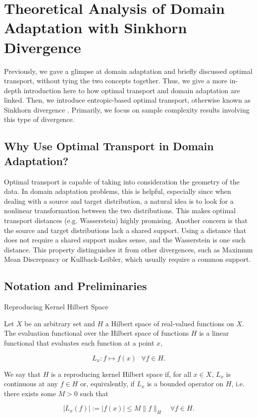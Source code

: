 \chapter{Theoretical Analysis of Domain Adaptation with Sinkhorn Divergence}

Previously, we gave a glimpse at domain adaptation and briefly discussed optimal transport, without tying the two concepts together. Thus, we give a more in-depth introduction here to how optimal transport and domain adaptation are linked. Then, we introduce entropic-based optimal transport, otherwise known as Sinkhorn divergence \cite{Genevay2018}. Primarily, we focus on sample complexity results involving this type of divergence.


\section*{Why Use Optimal Transport in Domain Adaptation?}
Optimal transport is capable of taking into consideration the geometry of the data. In domain adaptation problems, this is helpful, especially since when dealing with a source and target distribution, a natural idea is to look for a nonlinear transformation between the two distributions. This makes optimal transport distances (e.g. Wasserstein) highly promising. Another concern is that the source and target distributions lack a shared support. Using a distance that does not require a shared support makes sense, and the Wasserstein is one such distance. This property distinguishes it from other divergences, such as Maximum Mean Discrepancy or Kullback-Leibler, which usually require a common support.

\section{Notation and Preliminaries}

\begin{definition}{Reproducing Kernel Hilbert Space}
	
	Let $X$ be an arbitrary set and $H$ a Hilbert space of real-valued functions on $X$.  The evaluation functional over the Hilbert space of functions $H$ is a linear functional that evaluates each function at a point $x$,
	
	\[
	L_{x} : f \mapsto f(x)  \text{   } \forall f \in H.
	\]
	
	We say that $H$ is a reproducing kernel Hilbert space if, for all $x \in X$, $L_{x}$ is continuous at any $f\in H$ or, equivalently, if $L_x$ is a bounded operator on $H$, i.e. there exists some $M > 0$ such that
	
	\[
	|L_{x}(f)| := |f(x)| \le M \|f\|_H \quad \forall f \in H.
	\]

\end{definition}

